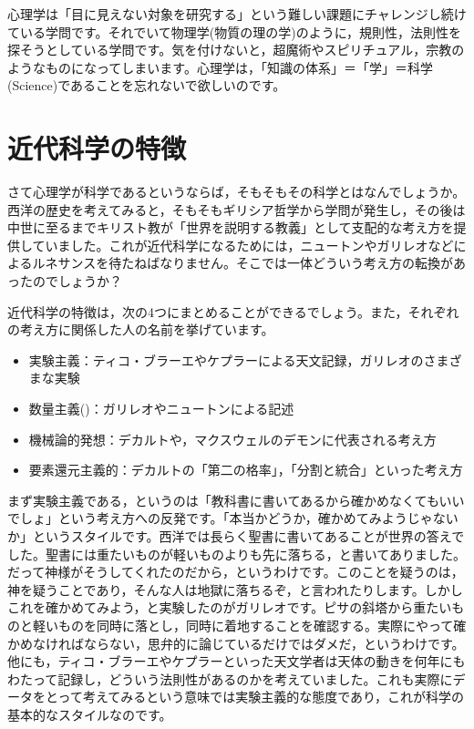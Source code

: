 \documentclass{ltjsbook}
\begin{document}
心理学は「目に見えない対象を研究する」という難しい課題にチャレンジし続けている学問です。それでいて物理学(物質の理の学)のように，規則性，法則性を探そうとしている学問です。気を付けないと，超魔術やスピリチュアル，宗教のようなものになってしまいます。心理学は，「知識の体系」＝「学」＝科学(Science)であることを忘れないで欲しいのです。

\section{近代科学の特徴}

さて心理学が科学であるというならば，そもそもその科学とはなんでしょうか。西洋の歴史を考えてみると，そもそもギリシア哲学から学問が発生し，その後は中世に至るまでキリスト教が「世界を説明する教義」として支配的な考え方を提供していました。これが近代科学になるためには，ニュートンやガリレオなどによるルネサンスを待たねばなりません。そこでは一体どういう考え方の転換があったのでしょうか？

近代科学の特徴は，次の4つにまとめることができるでしょう。また，それぞれの考え方に関係した人の名前を挙げています。
\begin{itemize}
	\item 実験主義：ティコ・ブラーエやケプラーによる天文記録，ガリレオのさまざまな実験
	\item 数量主義()：ガリレオやニュートンによる記述
	\item 機械論的発想：デカルトや，マクスウェルのデモンに代表される考え方
	\item 要素還元主義的：デカルトの「第二の格率」，「分割と統合」といった考え方
\end{itemize}

まず実験主義である，というのは「教科書に書いてあるから確かめなくてもいいでしょ」という考え方への反発です。「本当かどうか，確かめてみようじゃないか」というスタイルです。西洋では長らく聖書に書いてあることが世界の答えでした。聖書には重たいものが軽いものよりも先に落ちる，と書いてありました。だって神様がそうしてくれたのだから，というわけです。このことを疑うのは，神を疑うことであり，そんな人は地獄に落ちるぞ，と言われたりします。しかしこれを確かめてみよう，と実験したのがガリレオです。ピサの斜塔から重たいものと軽いものを同時に落とし，同時に着地することを確認する。実際にやって確かめなければならない，思弁的に論じているだけではダメだ，というわけです。他にも，ティコ・ブラーエやケプラーといった天文学者は天体の動きを何年にもわたって記録し，どういう法則性があるのかを考えていました。これも実際にデータをとって考えてみるという意味では実験主義的な態度であり，これが科学の基本的なスタイルなのです。
\end{document}
